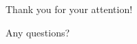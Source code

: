 \documentclass{beamer}
\begin{document}
\begin{frame}
\begin{center}
\begin{huge}
Thank you for your attention!

\vspace{4mm}
Any questions?
\end{huge}

\end{center}


\end{frame}

    













\end{document}
